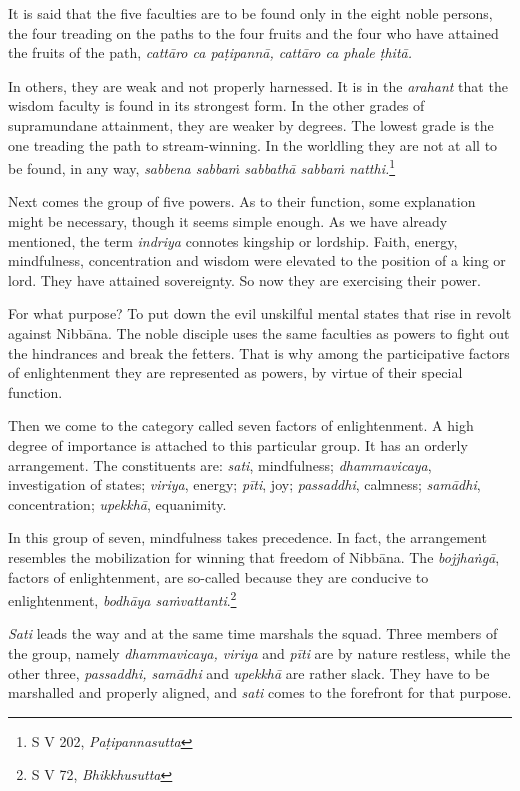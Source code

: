 It is said that the five faculties are to be found only in the eight noble persons, the four treading on the paths to the four fruits and the four who have attained the fruits of the path, \emph{cattāro ca paṭipannā, cattāro ca phale ṭhitā.}

In others, they are weak and not properly harnessed. It is in the \emph{arahant} that the wisdom faculty is found in its strongest form. In the other grades of supramundane attainment, they are weaker by degrees. The lowest grade is the one treading the path to stream-winning. In the worldling they are not at all to be found, in any way, \emph{sabbena sabbaṁ sabbathā sabbaṁ natthi.}\footnote{S V 202, \emph{Paṭipannasutta}}

Next comes the group of five powers. As to their function, some explanation might be necessary, though it seems simple enough. As we have already mentioned, the term \emph{indriya} connotes kingship or lordship. Faith, energy, mindfulness, concentration and wisdom were elevated to the position of a king or lord. They have attained sovereignty. So now they are exercising their power.

For what purpose? To put down the evil unskilful mental states that rise in revolt against Nibbāna. The noble disciple uses the same faculties as powers to fight out the hindrances and break the fetters. That is why among the participative factors of enlightenment they are represented as powers, by virtue of their special function.

Then we come to the category called seven factors of enlightenment. A high degree of importance is attached to this particular group. It has an orderly arrangement. The constituents are: \emph{sati}, mindfulness; \emph{dhammavicaya}, investigation of states; \emph{viriya}, energy; \emph{pīti}, joy; \emph{passaddhi}, calmness; \emph{samādhi}, concentration; \emph{upekkhā}, equanimity.

In this group of seven, mindfulness takes precedence. In fact, the arrangement resembles the mobilization for winning that freedom of Nibbāna. The \emph{bojjhaṅgā}, factors of enlightenment, are so-called because they are conducive to enlightenment, \emph{bodhāya saṁvattanti}.\footnote{S V 72, \emph{Bhikkhusutta}}

\emph{Sati} leads the way and at the same time marshals the squad. Three members of the group, namely \emph{dhammavicaya, viriya} and \emph{pīti} are by nature restless, while the other three, \emph{passaddhi, samādhi} and \emph{upekkhā} are rather slack. They have to be marshalled and properly aligned, and \emph{sati} comes to the forefront for that purpose.

